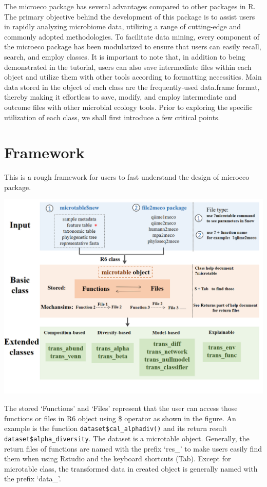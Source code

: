\documentclass[
]{book}
\begin{document}
The microeco package has several advantages compared to other packages in R.
The primary objective behind the development of this package is to assist users in rapidly analyzing microbiome data,
utilizing a range of cutting-edge and commonly adopted methodologies.
To facilitate data mining, every component of the microeco package has been modularized to ensure that users can easily recall, search, and employ classes.
It is important to note that, in addition to being demonstrated in the tutorial,
users can also save intermediate files within each object and utilize them with other tools according to formatting necessities.
Main data stored in the object of each class are the frequently-used data.frame format,
thereby making it effortless to save, modify, and employ intermediate and outcome files with other microbial ecology tools.
Prior to exploring the specific utilization of each class, we shall first introduce a few critical points.

\hypertarget{framework}{%
\section{Framework}\label{framework}}

This is a rough framework for users to fast understand the design of microeco package.

\begin{center}\includegraphics[width=800px]{Images/microeco_framework} \end{center}

The stored `Functions' and `Files' represent that the user can access those functions or files in R6 object using \$ operator
as shown in the figure. An example is the function \texttt{dataset\$cal\_alphadiv()} and its return result \texttt{dataset\$alpha\_diversity}.
The dataset is a microtable object.
Generally, the return files of functions are named with the prefix `res\_' to make users easily find them when using Rstudio and the keyboard shortcuts (Tab).
Except for microtable class, the transformed data in created object is generally named with the prefix `data\_'.
\end{document}
